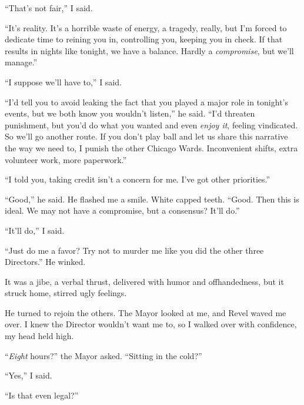 ``That's not fair,'' I said.



``It's reality.  It's a horrible waste of energy, a tragedy, really, but I'm forced to dedicate time to reining you in, controlling you, keeping you in check.  If that results in nights like tonight, we have a balance.  Hardly a \emph{compromise}, but we'll manage.''



``I suppose we'll have to,'' I said.



``I'd tell you to avoid leaking the fact that you played a major role in tonight's events, but we both know you wouldn't listen,'' he said.  ``I'd threaten punishment, but you'd do what you wanted and even \emph{enjoy it}, feeling vindicated.  So we'll go another route.  If you don't play ball and let us share this narrative the way we need to, I punish the other Chicago Wards.  Inconvenient shifts, extra volunteer work, more paperwork.''



``I told you, taking credit isn't a concern for me.  I've got other priorities.''



``Good,'' he said.  He flashed me a smile.  White capped teeth.  ``Good.  Then this is ideal.  We may not have a compromise, but a consensus?  It'll do.''



``It'll do,'' I said.



``Just do me a favor?  Try not to murder me like you did the other three Directors.''  He winked.



It was a jibe, a verbal thrust, delivered with humor and offhandedness, but it struck home, stirred ugly feelings.



He turned to rejoin the others.  The Mayor looked at me, and Revel waved me over.  I knew the Director wouldn't want me to, so I walked over with confidence, my head held high.



``\emph{Eight} hours?'' the Mayor asked.  ``Sitting in the cold?''



``Yes,'' I said.



``Is that even legal?''



